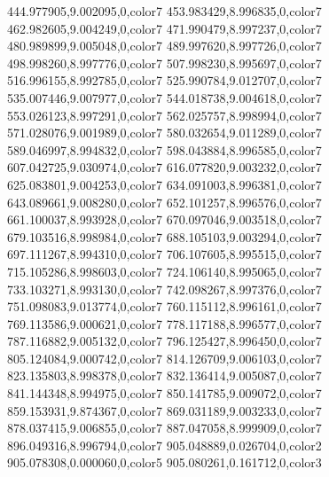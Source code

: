 444.977905,9.002095,0,color7
453.983429,8.996835,0,color7
462.982605,9.004249,0,color7
471.990479,8.997237,0,color7
480.989899,9.005048,0,color7
489.997620,8.997726,0,color7
498.998260,8.997776,0,color7
507.998230,8.995697,0,color7
516.996155,8.992785,0,color7
525.990784,9.012707,0,color7
535.007446,9.007977,0,color7
544.018738,9.004618,0,color7
553.026123,8.997291,0,color7
562.025757,8.998994,0,color7
571.028076,9.001989,0,color7
580.032654,9.011289,0,color7
589.046997,8.994832,0,color7
598.043884,8.996585,0,color7
607.042725,9.030974,0,color7
616.077820,9.003232,0,color7
625.083801,9.004253,0,color7
634.091003,8.996381,0,color7
643.089661,9.008280,0,color7
652.101257,8.996576,0,color7
661.100037,8.993928,0,color7
670.097046,9.003518,0,color7
679.103516,8.998984,0,color7
688.105103,9.003294,0,color7
697.111267,8.994310,0,color7
706.107605,8.995515,0,color7
715.105286,8.998603,0,color7
724.106140,8.995065,0,color7
733.103271,8.993130,0,color7
742.098267,8.997376,0,color7
751.098083,9.013774,0,color7
760.115112,8.996161,0,color7
769.113586,9.000621,0,color7
778.117188,8.996577,0,color7
787.116882,9.005132,0,color7
796.125427,8.996450,0,color7
805.124084,9.000742,0,color7
814.126709,9.006103,0,color7
823.135803,8.998378,0,color7
832.136414,9.005087,0,color7
841.144348,8.994975,0,color7
850.141785,9.009072,0,color7
859.153931,9.874367,0,color7
869.031189,9.003233,0,color7
878.037415,9.006855,0,color7
887.047058,8.999909,0,color7
896.049316,8.996794,0,color7
905.048889,0.026704,0,color2
905.078308,0.000060,0,color5
905.080261,0.161712,0,color3
